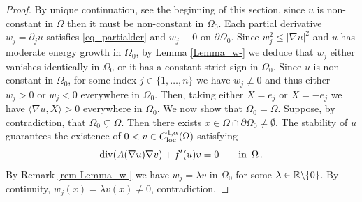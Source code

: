 \documentclass[10 pt,a4paper]{article}
\theoremstyle{definition}
\begin{document}
\begin{proof}
	By unique continuation, see the beginning of this section, since $u$ is non-constant in $\Omega$ then it must be non-constant in $\Omega_0$. Each partial derivative $w_j = \partial_j u$ satisfies \eqref{eq_partialder} and $w_j \equiv 0$ on $\partial\Omega_0$. Since $w_j^2 \leq |\nabla u|^2$ and $u$ has moderate energy growth in $\Omega_0$, by Lemma \ref{Lemma_w-} we deduce that $w_j$ either vanishes identically in $\Omega_0$ or it has a constant strict sign in $\Omega_0$. Since $u$ is non-constant in $\Omega_0$, for some index $j\in\{1,\dots,n\}$ we have $w_j \not \equiv 0$ and thus either $w_j>0$ or $w_j<0$ everywhere in $\Omega_0$. Then, taking either $X = e_j$ or $X = -e_j$ we have $\langle\nabla u,X\rangle > 0$ everywhere in $\Omega_0$. We now show that $\Omega_0 = \Omega$. Suppose, by contradiction, that $\Omega_0\subsetneq\Omega$. Then there exists $x\in\Omega\cap\partial\Omega_0\neq\emptyset$. The stability of $u$ guarantees the existence of $0<v\in C^{1,\alpha}_{\mathrm{loc}}(\Omega)$ satisfying
	\[
		\mathrm{div}(A(\nabla u)\nabla v) + f'(u)v = 0 \qquad \text{in } \, \Omega \, .
	\]
	By Remark \ref{rem-Lemma_w-} we have $w_j = \lambda v$ in $\Omega_0$ for some $\lambda\in\mathbb R\backslash\{0\}$. By continuity, $w_j(x) = \lambda v(x) \neq 0$, contradiction.
\end{proof}
\end{document}
